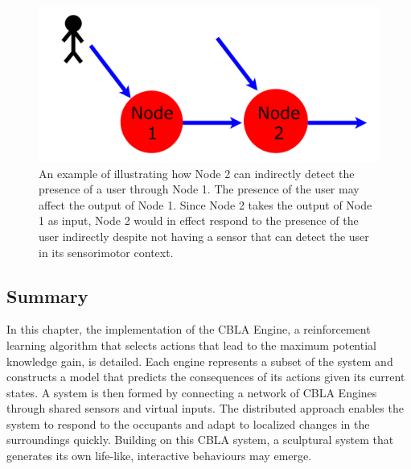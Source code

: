 \begin{figure}[!htb]
	\centering
	\includegraphics[height=0.20 \textheight]{"fig/cbla/Indirect input diagram"}
	\caption[Illustration explaining how virtual inputs may be used to detect changes outside of a Node's sensorimotor context]{An example of illustrating how Node 2 can indirectly detect the presence of a user through Node 1. The presence of the user may affect the output of Node 1. Since Node 2 takes the output of Node 1 as input, Node 2 would in effect respond to the presence of the user indirectly despite not having a sensor that can detect the user in its sensorimotor context.}
	\label{fig:Indirect input diagram}
\end{figure}

\subsection{Summary}

In this chapter, the implementation of the CBLA Engine, a reinforcement learning algorithm that selects actions that lead to the maximum potential knowledge gain, is detailed. Each engine represents a subset of the system and constructs a model that predicts the consequences of its actions given its current states. A system is then formed by connecting a network of CBLA Engines through shared sensors and virtual inputs. The distributed approach enables the system to respond to the occupants and adapt to localized changes in the surroundings quickly. Building on this CBLA system, a sculptural system that generates its own life-like, interactive behaviours may emerge.

\FloatBarrier  

